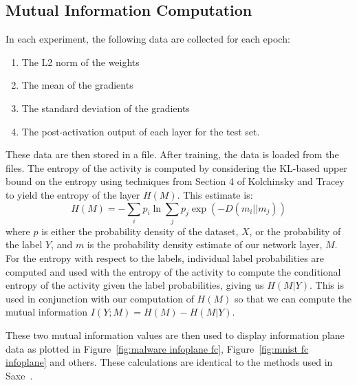 \subsection{Mutual Information Computation}\label{MI computation}
In each experiment, the following data are collected for each epoch:
\begin{enumerate}
	\item The L2 norm of the weights
	\item The mean of the gradients
	\item The standard deviation of the gradients
	\item The post-activation output of each layer for the test set. 
\end{enumerate}
These data are then stored in a file.
After training, the data is loaded from the files.
The entropy of the activity is computed by considering the KL-based upper bound on the entropy using techniques from Section 4 of Kolchinsky and Tracey~\cite{kolchinsky2017estimating} to yield the entropy of the layer $H(M)$.
This estimate is:
\begin{equation}
	H(M) = -\sum_{i} p_i \ln \sum_{j} p_j \exp(-D(m_i || m_j))
\end{equation}
where $p$ is either the probability density of the dataset, $X$, or the probability of the label $Y$, and $m$ is the probability density estimate of our network layer, $M$.
For the entropy with respect to the labels, individual label probabilities are computed and used with the entropy of the activity to compute the conditional entropy of the activity given the label probabilities, giving us $H(M|Y)$.
This is used in conjunction with our computation of $H(M)$ so that we can compute the mutual information $I(Y; M) = H(M) - H(M|Y)$.
 
These two mutual information values are then used to display information plane data as plotted in Figure~\ref{fig:malware infoplane fc}, Figure~\ref{fig:mnist fc infoplane} and others.
These calculations are identical to the methods used in Saxe~\cite{saxe2019information}.

